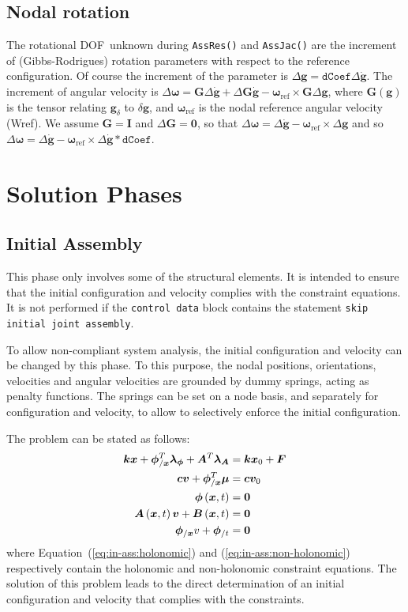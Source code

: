 \documentclass[10pt,dvips,fleqn,subeqn]{report}
\newcommand{\T}[1]{\bm{#1}}
\newcommand{\dof}{DOF}
\begin{document}
\section{Nodal rotation}
The rotational \dof\ unknown during \texttt{AssRes()} and \texttt{AssJac()}
are the increment of (Gibbs-Rodrigues) rotation parameters
with respect to the reference configuration.
Of course the increment of the parameter is
$\Delta \T g=\texttt{dCoef}\Delta \dot{\T g}$.
The increment of angular velocity is 
$\Delta \T \omega = \T G\Delta \dot{\T g}+ \Delta \T G \dot{\T g}-
\T \omega_{\mathrm{ref}}\times \T G \Delta \T g$,
where $\T G(\T g)$ is the tensor relating $\T g_\delta$ to $\delta \T g$,
and $\T \omega_{\mathrm{ref}}$ is the nodal reference angular velocity (Wref).
We assume $\T G = \T I$ and $\Delta \T G = \T 0$,
so that $\Delta \T \omega = \Delta \dot{\T g}-\T \omega_{\mathrm{ref}}\times\Delta \T g$
and so $\Delta \T \omega = \Delta \dot{\T g}-
\T \omega_{\mathrm{ref}}\times\Delta \dot{\T g} * \texttt{dCoef}$.


\chapter{Solution Phases}
\section{Initial Assembly}
This phase only involves some of the structural elements.
It is intended to ensure that the initial configuration and velocity 
complies with the constraint equations.
It is not performed if the \texttt{control data} block contains 
the statement \texttt{skip initial joint assembly}.

To allow non-compliant system analysis, the initial configuration 
and velocity can be changed by this phase.
To this purpose, the nodal positions, orientations, velocities
and angular velocities are grounded by dummy springs, acting 
as penalty functions.
The springs can be set on a node basis, and separately 
for configuration and velocity, to allow to selectively enforce 
the initial configuration.

The problem can be stated as follows:
\begin{align}
	\T{k} \T{x} + \T{\phi}_{/\T{x}}^T \T{\lambda}_{\T{\phi}} + \T{A}^T \T{\lambda}_{\T{A}}
		& = \T{k} \T{x}_0 + \T{F} \\
	\T{c} \T{v} + \T{\phi}_{/\T{x}}^T \T{\mu} & = \T{c} \T{v}_0 \\
	\T{\phi}\plbr{\T{x}, t} & = \T{0} \label{eq:in-ass:holonomic} \\
	\T{A}\plbr{\T{x}, t} \T{v} + \T{B}\plbr{\T{x}, t} & = \T{0} \label{eq:in-ass:non-holonomic} \\
	\T{\phi}_{/\T{x}} v + \T{\phi}_{/t} & = \T{0}
\end{align}
where Equation~(\ref{eq:in-ass:holonomic}) and (\ref{eq:in-ass:non-holonomic})
respectively contain the holonomic and non-holonomic constraint equations.
The solution of this problem leads to the direct determination
of an initial configuration and velocity that complies 
with the constraints.
\end{document}
